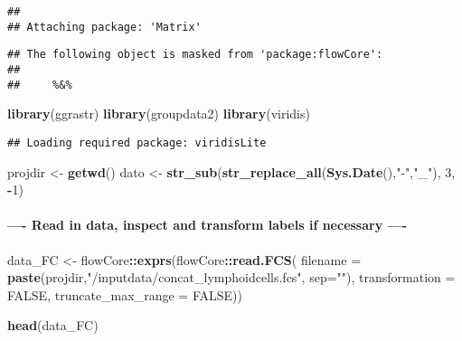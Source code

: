 \documentclass[
]{article}
\newenvironment{Shaded}{\begin{snugshade}}{\end{snugshade}}
\newcommand{\AttributeTok}[1]{\textcolor[rgb]{0.13,0.29,0.53}{#1}}
\newcommand{\ConstantTok}[1]{\textcolor[rgb]{0.56,0.35,0.01}{#1}}
\newcommand{\DecValTok}[1]{\textcolor[rgb]{0.00,0.00,0.81}{#1}}
\newcommand{\FunctionTok}[1]{\textcolor[rgb]{0.13,0.29,0.53}{\textbf{#1}}}
\newcommand{\NormalTok}[1]{#1}
\newcommand{\OtherTok}[1]{\textcolor[rgb]{0.56,0.35,0.01}{#1}}
\newcommand{\SpecialCharTok}[1]{\textcolor[rgb]{0.81,0.36,0.00}{\textbf{#1}}}
\newcommand{\StringTok}[1]{\textcolor[rgb]{0.31,0.60,0.02}{#1}}
\begin{document}
\begin{verbatim}
## 
## Attaching package: 'Matrix'
\end{verbatim}

\begin{verbatim}
## The following object is masked from 'package:flowCore':
## 
##     %&%
\end{verbatim}

\begin{Shaded}
\begin{Highlighting}[]
\FunctionTok{library}\NormalTok{(ggrastr)}
\FunctionTok{library}\NormalTok{(groupdata2)}
\FunctionTok{library}\NormalTok{(viridis)}
\end{Highlighting}
\end{Shaded}

\begin{verbatim}
## Loading required package: viridisLite
\end{verbatim}

\begin{Shaded}
\begin{Highlighting}[]
\NormalTok{projdir }\OtherTok{\textless{}{-}} \FunctionTok{getwd}\NormalTok{()}
\NormalTok{dato }\OtherTok{\textless{}{-}} \FunctionTok{str\_sub}\NormalTok{(}\FunctionTok{str\_replace\_all}\NormalTok{(}\FunctionTok{Sys.Date}\NormalTok{(),}\StringTok{"{-}"}\NormalTok{,}\StringTok{"\_"}\NormalTok{), }\DecValTok{3}\NormalTok{, }\SpecialCharTok{{-}}\DecValTok{1}\NormalTok{)}
\end{Highlighting}
\end{Shaded}

\hypertarget{read-in-data-inspect-and-transform-labels-if-necessary--}{%
\paragraph{---- Read in data, inspect and transform labels if necessary
----}\label{read-in-data-inspect-and-transform-labels-if-necessary--}}

\begin{Shaded}
\begin{Highlighting}[]
\NormalTok{data\_FC }\OtherTok{\textless{}{-}}\NormalTok{ flowCore}\SpecialCharTok{::}\FunctionTok{exprs}\NormalTok{(flowCore}\SpecialCharTok{::}\FunctionTok{read.FCS}\NormalTok{(}
  \AttributeTok{filename =} \FunctionTok{paste}\NormalTok{(projdir,}\StringTok{"/inputdata/concat\_lymphoidcells.fcs"}\NormalTok{, }\AttributeTok{sep=}\StringTok{""}\NormalTok{), }
  \AttributeTok{transformation =} \ConstantTok{FALSE}\NormalTok{, }\AttributeTok{truncate\_max\_range =} \ConstantTok{FALSE}\NormalTok{))}

\FunctionTok{head}\NormalTok{(data\_FC)}
\end{Highlighting}
\end{Shaded}
\end{document}
